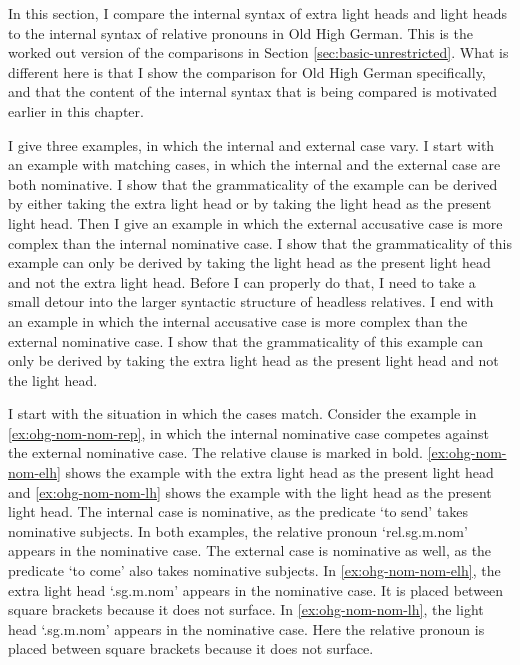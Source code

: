 In this section, I compare the internal syntax of extra light heads and light heads to the internal syntax of relative pronouns in Old High German. This is the worked out version of the comparisons in Section \ref{sec:basic-unrestricted}. What is different here is that I show the comparison for Old High German specifically, and that the content of the internal syntax that is being compared is motivated earlier in this chapter.

I give three examples, in which the internal and external case vary.
I start with an example with matching cases, in which the internal and the external case are both nominative. I show that the grammaticality of the example can be derived by either taking the extra light head or by taking the light head as the present light head.
Then I give an example in which the external accusative case is more complex than the internal nominative case. I show that the grammaticality of this example can only be derived by taking the light head as the present light head and not the extra light head. Before I can properly do that, I need to take a small detour into the larger syntactic structure of headless relatives.
I end with an example in which the internal accusative case is more complex than the external nominative case. I show that the grammaticality of this example can only be derived by taking the extra light head as the present light head and not the light head.

I start with the situation in which the cases match.
Consider the example in \ref{ex:ohg-nom-nom-rep}, in which the internal nominative case competes against the external nominative case. The relative clause is marked in bold. \ref{ex:ohg-nom-nom-elh} shows the example with the extra light head as the present light head and \ref{ex:ohg-nom-nom-lh} shows the example with the light head as the present light head.
The internal case is nominative, as the predicate  `to send' takes nominative subjects.
In both examples, the relative pronoun  `\ac{rel}.\ac{sg}.\ac{m}.\ac{nom}' appears in the nominative case.
The external case is nominative as well, as the predicate  `to come' also takes nominative subjects.
In \ref{ex:ohg-nom-nom-elh}, the extra light head  `.\ac{sg}.\ac{m}.\ac{nom}' appears in the nominative case. It is placed between square brackets because it does not surface.
In \ref{ex:ohg-nom-nom-lh}, the light head  `.\ac{sg}.\ac{m}.\ac{nom}' appears in the nominative case. Here the relative pronoun is placed between square brackets because it does not surface.

